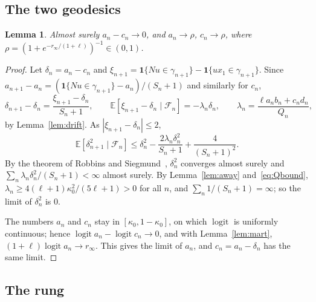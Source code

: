 \documentclass[11pt]{amsart}
\newtheorem{lemma}[theorem]{Lemma}
\theoremstyle{remark}
\newcommand{\EE}{\mathbb{E}}
\newcommand{\cF}{\mathcal{F}}
\newcommand{\one}{\mathbf{1}}
\newcommand{\logit}{\operatorname{logit}}
\begin{document}
\subsection{The two geodesics}

\begin{lemma}\label{lem:delta}
Almost surely $a_n-c_n\to0$, and $a_n\to\rho$, $c_n\to\rho$, where $\rho=(1+e^{-r_\infty/(1+\ell)})^{-1}\in(0,1)$.
\end{lemma}
\begin{proof}
Let $\delta_n=a_n-c_n$ and $\xi_{n+1}=\one\{Nu\in\gamma_{n+1}\}-\one\{ux_1\in\gamma_{n+1}\}$. Since
$a_{n+1}-a_n=(\one\{Nu\in\gamma_{n+1}\}-a_n)/(S_n+1)$ and similarly for $c_n$,
\[
\delta_{n+1}-\delta_n=\frac{\xi_{n+1}-\delta_n}{S_n+1},\qquad
\EE[\xi_{n+1}-\delta_n\mid\cF_n]=-\lambda_n\delta_n,\qquad \lambda_n=\frac{\ell a_nb_n+c_nd_n}{Q_n},
\]
by Lemma~\ref{lem:drift}. As $|\xi_{n+1}-\delta_n|\le2$,
\[
\EE[\delta_{n+1}^2\mid\cF_n]\le\delta_n^2-\frac{2\lambda_n\delta_n^2}{S_n+1}+\frac{4}{(S_n+1)^2} .
\]
By the theorem of Robbins and Siegmund~\cite{RS}, $\delta_n^2$ converges almost surely and
$\sum_n\lambda_n\delta_n^2/(S_n+1)<\infty$ almost surely. By Lemma~\ref{lem:away} and~\eqref{eq:Qbound},
$\lambda_n\ge4(\ell+1)\kappa_0^2/(5\ell+1)>0$ for all $n$, and $\sum_n1/(S_n+1)=\infty$; so the limit of $\delta_n^2$
is $0$.

The numbers $a_n$ and $c_n$ stay in $[\kappa_0,1-\kappa_0]$, on which $\logit$ is uniformly continuous; hence
$\logit a_n-\logit c_n\to0$, and with Lemma~\ref{lem:mart}, $(1+\ell)\logit a_n\to r_\infty$. This gives the limit
of $a_n$, and $c_n=a_n-\delta_n$ has the same limit.
\end{proof}

\subsection{The rung}
\end{document}
